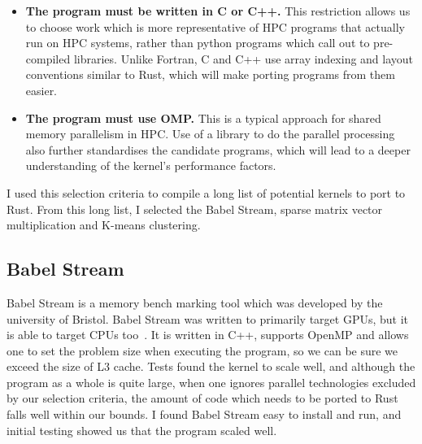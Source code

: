 \begin{itemize}
  \item \textbf{The program must be written in C or C++.} This restriction allows us to choose work which is more representative of HPC programs that actually run on HPC systems, rather than python programs which call out to pre-compiled libraries. Unlike Fortran, C and C++ use array indexing and layout conventions similar to Rust, which will make porting programs from them easier.

  \item \textbf{The program must use OMP.} This is a typical approach for shared memory parallelism in HPC\@. Use of a library to do the parallel processing also further standardises the candidate programs, which will lead to a deeper understanding of the kernel's performance factors.
\end{itemize}

I used this selection criteria to compile a long list of potential kernels to port to Rust. From this long list, I selected the Babel Stream, sparse matrix vector multiplication and K-means clustering.

\subsection{Babel Stream}

Babel Stream is a memory bench marking tool which was developed by the university of Bristol. Babel Stream was written to primarily target GPUs, but it is able to target CPUs too~\cite{BabelStream}.  It is written in C++, supports OpenMP and allows one to set the problem size when executing the program, so we can be sure we exceed the size of L3 cache. Tests found the kernel to scale well, and although the program as a whole is quite large, when one ignores parallel technologies excluded by our selection criteria, the amount of code which needs to be ported to Rust falls well within our bounds. I found Babel Stream easy to install and run, and initial testing showed us that the program scaled well.

